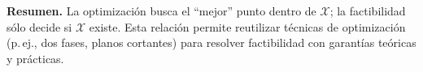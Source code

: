 \medskip
\noindent\textbf{Resumen.} La optimización busca el “mejor” punto dentro de $\mathcal{X}$; la factibilidad sólo decide si $\mathcal{X}$ existe. Esta relación permite reutilizar técnicas de optimización (p.\,ej., dos fases, planos cortantes) para resolver factibilidad con garantías teóricas y prácticas.
